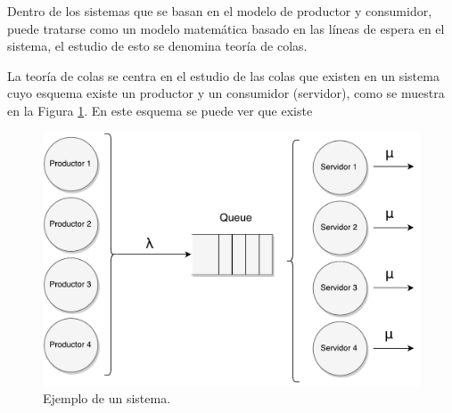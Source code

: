 Dentro de los sistemas que se basan en el modelo de productor y consumidor, puede tratarse como un modelo matemática basado en las líneas de espera en el sistema, el estudio de esto se denomina teoría de colas.

La teoría de colas se centra en el estudio de las colas que existen en un sistema cuyo esquema existe un productor y un consumidor (servidor), como se muestra en la Figura \ref{fig:teoriaColas}. En este esquema se puede ver que existe 

\begin{figure}
	\includegraphics[scale=1]{images/TeoriaColas.pdf}
	\caption{Ejemplo de un sistema.}
	\label{fig:teoriaColas}
\end{figure}